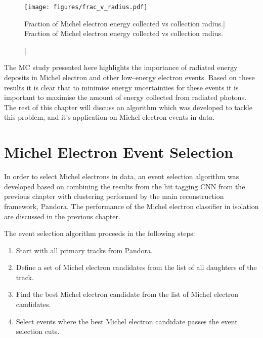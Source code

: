 \begin{figure}
	\centering
	\texttt{[image: figures/frac\_v\_radius.pdf]}
	\caption
	[Fraction of Michel electron energy collected vs collection radius.]
	{Fraction of Michel electron energy collected vs collection radius.}
	\label{fig:frac_v_radius}
\end{figure}

The MC study presented here highlights the importance of radiated energy
deposits in Michel electron and other low--energy electron events. Based on
these results it is clear that to minimise energy uncertainties for these events
it is important to maximise the amount of energy collected from radiated 
photons. The rest of this chapter will discuss an algorithm which was developed 
to tackle this problem, and it's application on Michel electron events in 
\protodune{} data.

\section{Michel Electron Event Selection} \label{ME_ES}

In order to select Michel electrons in \protodune{} data, an event selection
algorithm was developed based on combining the results from the hit tagging CNN 
from the previous chapter with clustering performed by the main \protodune{} 
reconstruction framework, Pandora. The performance of the Michel electron 
classifier in isolation are discussed in the previous chapter.

The event selection algorithm proceeds in the following steps:
\begin{enumerate}
	\item Start with all primary tracks from Pandora.
	\item Define a set of Michel electron candidates from the list of all
		daughters of the track.
	\item Find the best Michel electron candidate from the list of Michel electron
		candidates.
	\item Select events where the best Michel electron candidate passes the event
		selection cuts.
\end{enumerate}

